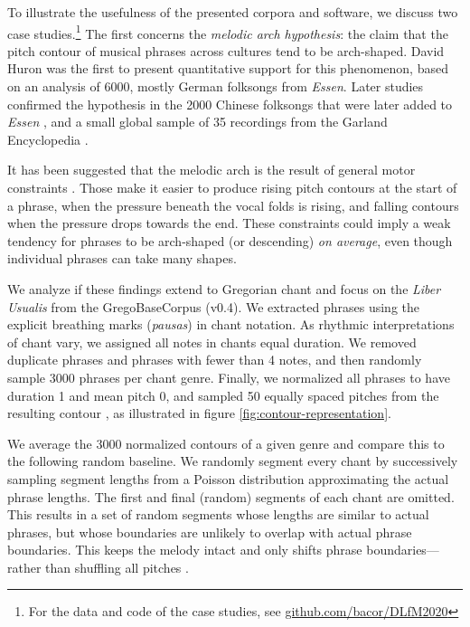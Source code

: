 \documentclass[sigconf,screen]{acmart}
\begin{document}
To illustrate the usefulness of the presented corpora and software, we discuss two case studies.\footnote{%
    \label{fn:repository}
    For the data and code of the case studies, see \href{https://github.com/bacor/DLfM2020}{github.com/bacor/DLfM2020}}
The first concerns the \emph{melodic arch hypothesis}: the claim that the pitch contour of musical phrases across cultures tend to be arch-shaped.
David Huron \cite{Huron1996} was the first to present quantitative support for this phenomenon, based on an analysis of 6000, mostly German folksongs from \emph{Essen}.
Later studies confirmed the hypothesis in the 2000 Chinese folksongs that were later added to \emph{Essen} \cite{Tierney2011}, and a small global sample of 35 recordings from the Garland Encyclopedia \cite{Savage2017a}.


It has been suggested that the melodic arch is the result of general motor constraints \cite{Tierney2011}.
Those make it easier to produce rising pitch contours at the start of a phrase, when the pressure beneath the vocal folds is rising, and falling contours when the pressure drops towards the end.
These constraints could imply a weak tendency for phrases to be arch-shaped (or descending) \emph{on average}, even though individual phrases can take many shapes.


We analyze if these findings extend to Gregorian chant and focus on the \emph{Liber Usualis} from the GregoBaseCorpus (v0.4).
We extracted phrases using the explicit breathing marks (\emph{pausas}) in chant notation.
As rhythmic interpretations of chant vary, we assigned all notes in chants equal duration.
We removed duplicate phrases and phrases with fewer than 4 notes, and then randomly sample 3000 phrases per chant genre.
Finally, we normalized all phrases to have duration 1 and mean pitch 0, and sampled 50 equally spaced pitches from the resulting contour \cite{Tierney2011,Savage2017a}, as illustrated in figure \ref{fig:contour-representation}.


We average the 3000 normalized contours of a given genre and compare this to the following random baseline.
We randomly segment every chant by successively sampling segment lengths from a Poisson distribution approximating the actual phrase lengths.
The first and final (random) segments of each chant are omitted.
This results in a set of random segments whose lengths are similar to actual phrases, but whose boundaries are unlikely to overlap with actual phrase  boundaries.
This keeps the melody intact and only shifts phrase boundaries---rather than shuffling all pitches \cite{Savage2017a}.
\end{document}
